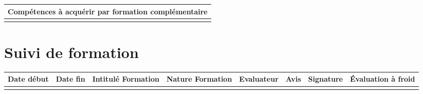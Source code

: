 \documentclass[11pt]{article}
\begin{document}
\centering
	\begin{longtable}{|p{12cm}|}
	\hline
	\rowcolor{gray!40} Compétences à acquérir par formation complémentaire \\
	\hline
	  \\
	\hline
	\end{longtable}

\section*{\large Suivi de formation}

\centering
	\begin{longtable}{|p{1.2cm}|p{1.2cm}|p{1.2cm}|p{1.2cm}|p{1.2cm}|p{1.2cm}|p{1.2cm}|p{1.2cm}|}
	\hline
	\rowcolor{gray!40} \tiny Date début & \tiny Date fin & \tiny Intitulé Formation & \tiny Nature Formation & \tiny Evaluateur & \tiny Avis & \tiny Signature & \tiny Évaluation à froid \\
	\hline
	 & & & & & & & \\
	\hline
	\end{longtable}
\end{document}

